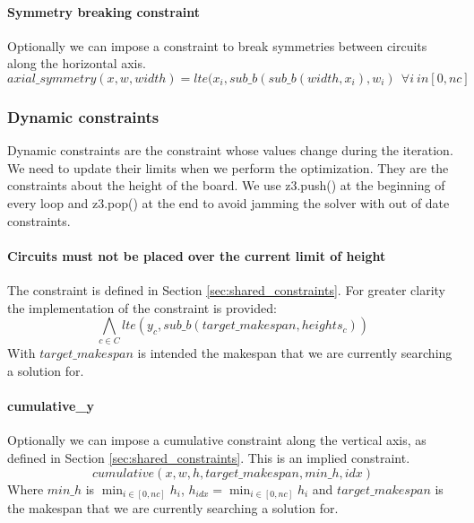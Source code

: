    \paragraph*{Symmetry breaking constraint}
      Optionally we can impose a constraint to break symmetries between circuits along
      the horizontal axis.
      \begin{equation}
        axial\_symmetry(x, w, width) = lte(x_i, sub\_b(sub\_b(width, x_i), w_i) \ \ \forall i \ in [0, nc]
      \end{equation}

  \subsubsection{Dynamic constraints}  \label{subsec:SAT_dynamic_cons}
    Dynamic constraints are the constraint whose values change during the iteration. We
    need to update their limits when we perform the optimization. They are the constraints 
    about the height of the board. We use z3.push() at the beginning of every loop and z3.pop()
    at the end to avoid jamming the solver with out of date constraints.\\

    \paragraph*{Circuits must not be placed over the current limit of height}
    The constraint is defined in Section \ref{sec:shared_constraints}. 
    For greater clarity the implementation of the constraint is provided:
      \begin{equation}
          \bigwedge_{c \in C} lte(y_c, sub\_b(target\_makespan, heights_c))
      \end{equation}
      With \(target\_makespan\) is intended the makespan that we are currently searching a solution for.

    \paragraph*{cumulative\_y}
    Optionally we can impose a cumulative constraint along the vertical axis, 
    as defined in Section \ref{sec:shared_constraints}.
    This is an implied constraint.
      \[cumulative(x, w, h, target\_makespan, min\_h, idx) \]
    Where \(min\_h\) is \(\min_{i \in [0,nc]} h_i\), \( h_{idx} = \min_{i \in [0,nc]} h_i\) and 
    \(target\_makespan\) is the makespan that we are currently searching a solution for.

